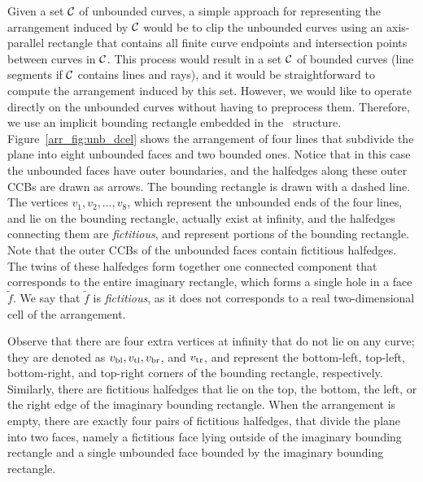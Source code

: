 \begin{ccAdvanced}
Given a set ${\cal C}$ of unbounded curves, a simple approach for
representing the arrangement induced by ${\cal C}$ would be to clip the
unbounded curves using an axis-parallel rectangle that contains all
finite curve endpoints and intersection points between curves in
${\cal C}$. This process would result in a set ${\cal C}$ of bounded curves
(line segments if ${\cal C}$ contains lines and rays), and it would be
straightforward to compute the arrangement induced by this set.
However, we would like to operate directly on the unbounded curves
without having to preprocess them. Therefore, we use an implicit
bounding rectangle embedded in the \dcel\ structure.
Figure~\ref{arr_fig:unb_dcel} shows the arrangement of four lines
that subdivide the plane into eight unbounded faces and two bounded
ones. Notice that in this case the unbounded faces have outer
boundaries, and the halfedges along these outer CCBs are drawn as 
arrows. The bounding rectangle is drawn with a dashed line. The
vertices $v_1,v_2,\ldots,v_8$, which represent the unbounded ends of 
the four lines, and lie on the bounding rectangle, actually exist at
infinity, and the halfedges connecting them are \emph{fictitious}, and
represent portions of the bounding rectangle. Note that the outer CCBs
of the unbounded faces contain fictitious halfedges. The twins of these
halfedges form together one connected component that corresponds to
the entire imaginary rectangle, which forms a single hole in a face
$\tilde{f}$. We say that $\tilde{f}$ is \emph{fictitious}, as it does
not corresponds to a real two-dimensional cell of the arrangement.

Observe that there are four extra vertices at infinity that do not lie
on any curve; they are denoted as $v_{\rm bl}, v_{\rm tl}, 
v_{\rm br}$, and $v_{\rm tr}$, and represent the bottom-left, top-left,
bottom-right, and top-right corners of the bounding rectangle,
respectively. Similarly, there are fictitious halfedges that lie on
the top, the bottom, the left, or the right edge of the imaginary
bounding rectangle. When the arrangement is empty, there are exactly
four pairs of fictitious halfedges, that divide the plane into two
faces, namely a fictitious face lying outside of the imaginary bounding
rectangle and a single unbounded face bounded by the imaginary
bounding rectangle. 


\end{ccAdvanced}
